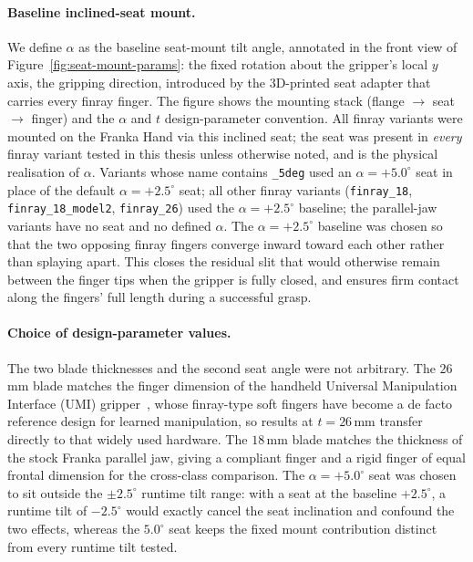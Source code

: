 \paragraph{Baseline inclined-seat mount.}
We define $\alpha$ as the baseline seat-mount tilt angle, annotated in
the front view of Figure~\ref{fig:seat-mount-params}: the fixed
rotation about the gripper's local $y$ axis, the gripping direction,
introduced by the 3D-printed seat adapter that carries every finray
finger. The figure shows the mounting stack (flange $\to$ seat $\to$
finger) and the $\alpha$ and $t$ design-parameter convention. All finray variants were mounted on the Franka Hand via this
inclined seat; the seat was present in \emph{every} finray variant
tested in this thesis unless otherwise noted, and is the physical
realisation of $\alpha$. Variants whose name contains \texttt{\_5deg}
used an $\alpha = +5.0^{\circ}$ seat in place of the default
$\alpha = +2.5^{\circ}$ seat; all other finray variants
(\texttt{finray\_18}, \texttt{finray\_18\_model2}, \texttt{finray\_26})
used the $\alpha = +2.5^{\circ}$ baseline; the parallel-jaw variants have
no seat and no defined $\alpha$. The $\alpha = +2.5^{\circ}$ baseline
was chosen so that the two opposing finray fingers converge inward
toward each other rather than splaying apart. This closes the residual
slit that would otherwise remain between the finger tips when the
gripper is fully closed, and ensures firm contact along the fingers'
full length during a successful grasp.

\paragraph{Choice of design-parameter values.}
The two blade thicknesses and the second seat angle were not arbitrary.
The $26$\,mm blade matches the finger dimension of the handheld
Universal Manipulation Interface (UMI) gripper~\cite{chi2024umi}, whose
finray-type soft fingers have become a de facto reference design for
learned manipulation, so results at $t = 26$\,mm transfer directly to
that widely used hardware. The $18$\,mm blade matches the thickness of
the stock Franka parallel jaw, giving a compliant finger and a rigid
finger of equal frontal dimension for the cross-class comparison. The
$\alpha = +5.0^{\circ}$ seat was chosen to sit outside the
$\pm 2.5^{\circ}$ runtime tilt range: with a seat at the baseline
$+2.5^{\circ}$, a runtime tilt of $-2.5^{\circ}$ would exactly cancel
the seat inclination and confound the two effects, whereas the
$5.0^{\circ}$ seat keeps the fixed mount contribution distinct from
every runtime tilt tested.


